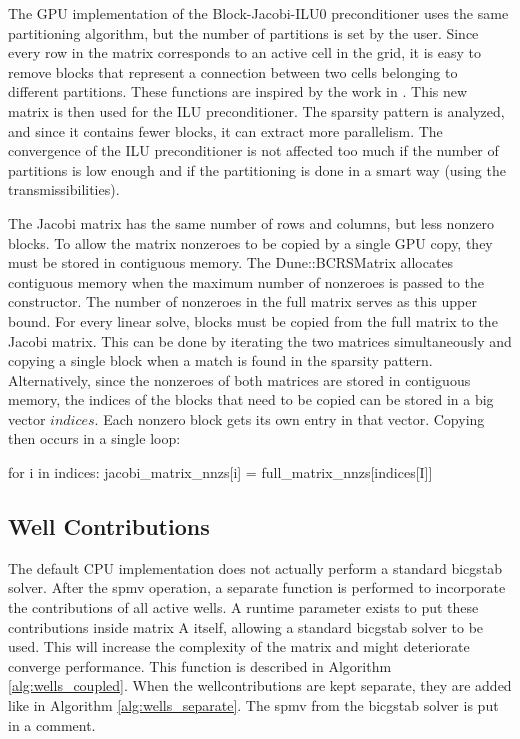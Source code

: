 The GPU implementation of the Block-Jacobi-ILU0 preconditioner uses the same partitioning algorithm, but the number of partitions is set by the user.
Since every row in the matrix corresponds to an active cell in the grid, it is easy to remove blocks that represent a connection between two cells belonging to different partitions.
These functions are inspired by the work in \cite{andreas}.
This new matrix is then used for the ILU preconditioner.
The sparsity pattern is analyzed, and since it contains fewer blocks, it can extract more parallelism.
The convergence of the ILU preconditioner is not affected too much if the number of partitions is low enough and if the partitioning is done in a smart way (using the transmissibilities).

The Jacobi matrix has the same number of rows and columns, but less nonzero blocks. To allow the matrix nonzeroes to be copied by a single GPU copy, they must be stored in contiguous memory. The Dune::BCRSMatrix allocates contiguous memory when the maximum number of nonzeroes is passed to the constructor. The number of nonzeroes in the full matrix serves as this upper bound.
For every linear solve, blocks must be copied from the full matrix to the Jacobi matrix.
This can be done by iterating the two matrices simultaneously and copying a single block when a match is found in the sparsity pattern.
Alternatively, since the nonzeroes of both matrices are stored in contiguous memory, the indices of the blocks that need to be copied can be stored in a big vector $indices$. Each nonzero block gets its own entry in that vector. Copying then occurs in a single loop:
\begin{algorithm}
\caption{Copy indexes}
\begin{algorithmic}
\STATE for i in indices: 
\STATE \hspace{0.5cm}jacobi\_matrix\_nnzs[i] = full\_matrix\_nnzs[indices[I]]
\end{algorithmic}
\end{algorithm}

\subsection{Well Contributions}
The default CPU implementation does not actually perform a standard bicgstab solver.
After the spmv operation, a separate function is performed to incorporate the contributions of all active wells.
A runtime parameter exists to put these contributions inside matrix A itself, allowing a standard bicgstab solver to be used.
This will increase the complexity of the matrix and might deteriorate converge performance.
This function is described in Algorithm \ref{alg:wells_coupled}.
When the wellcontributions are kept separate, they are added like in Algorithm \ref{alg:wells_separate}.
The spmv from the bicgstab solver is put in a comment.


